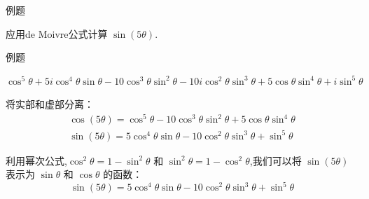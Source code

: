 \documentclass[fontset=windows, chinese, 10pt]{beamer}
\begin{document}
\begin{frame}{例题}
  {
  \begin{example}
    应用de Moivre公式计算 $\sin(5\theta)$.
\end{example}
 }


\end{frame}

\begin{frame}{例题}

\begin{solution}
$  \cos^5\theta + 5i\cos^4\theta \sin\theta - 10\cos^3\theta \sin^2\theta  - 10i\cos^2\theta \sin^3\theta + 5\cos\theta \sin^4\theta + i\sin^5\theta $

    
    将实部和虚部分离：
    \begin{eqnarray*}
      \cos(5\theta) = \cos^5\theta - 10\cos^3\theta \sin^2\theta + 5\cos\theta \sin^4\theta \\
      \sin(5\theta) = 5\cos^4\theta \sin\theta - 10\cos^2\theta \sin^3\theta + \sin^5\theta
  \end{eqnarray*}
    
    利用幂次公式,$\cos^2\theta = 1 - \sin^2\theta$ 和 $\sin^2\theta = 1 - \cos^2\theta$,我们可以将 $\sin(5\theta)$ 表示为 $\sin\theta$ 和 $\cos\theta$ 的函数：
    \[
    \sin(5\theta) = 5\cos^4\theta \sin\theta - 10\cos^2\theta \sin^3\theta + \sin^5\theta
    \]
    
  \end{solution}
 
 \end{frame}
 
\end{document}

